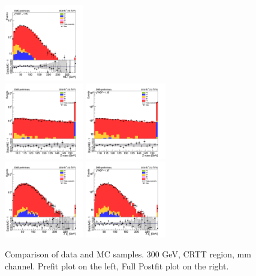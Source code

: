 \begin{figure}[tbp]
\begin{center}
    \includegraphics[width=0.31\textwidth]{figures/mm_300_april18/met_pt_mm_CRTT_FullPostfit_plot_apr18.png}\\
    \includegraphics[width=0.31\textwidth]{figures/mm_300_april18/zmass_high_mm_CRTT_prefit_plot_apr18.png}
    \includegraphics[width=0.31\textwidth]{figures/mm_300_april18/zmass_high_mm_CRTT_FullPostfit_plot_apr18.png}\\
    \includegraphics[width=0.31\textwidth]{figures/mm_300_april18/zpt0_mm_CRTT_prefit_plot_apr18.png}
    \includegraphics[width=0.31\textwidth]{figures/mm_300_april18/zpt0_mm_CRTT_FullPostfit_plot_apr18.png}\\
    \caption{Comparison of data and MC samples. 300 GeV, CRTT region, mm channel. Prefit plot on the left,           Full Postfit plot on the right.}
    \label{fig:MCcomparisons_mm_low_CRTT_2}
  \end{center}
\end{figure}

